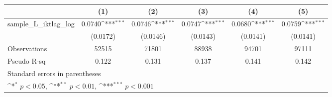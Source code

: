 {
\def\sym#1{\ifmmode^{#1}\else\(^{#1}\)\fi}
\begin{tabular}{l*{5}{c}}
\hline\hline
                &\multicolumn{1}{c}{(1)}         &\multicolumn{1}{c}{(2)}         &\multicolumn{1}{c}{(3)}         &\multicolumn{1}{c}{(4)}         &\multicolumn{1}{c}{(5)}         \\
\hline
sample\_L\_iktlag\_log&   0.0740\sym{***}&   0.0746\sym{***}&   0.0747\sym{***}&   0.0680\sym{***}&   0.0759\sym{***}\\
                & (0.0172)         & (0.0146)         & (0.0143)         & (0.0141)         & (0.0141)         \\
\hline
Observations    &    52515         &    71801         &    88938         &    94701         &    97111         \\
Pseudo R-sq     &    0.122         &    0.131         &    0.137         &    0.141         &    0.142         \\
\hline\hline
\multicolumn{6}{l}{\footnotesize Standard errors in parentheses}\\
\multicolumn{6}{l}{\footnotesize \sym{*} \(p<0.05\), \sym{**} \(p<0.01\), \sym{***} \(p<0.001\)}\\
\end{tabular}
}
